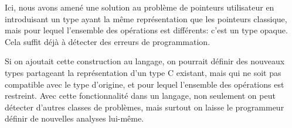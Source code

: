 Ici, nous avons amené une solution au problème de pointeurs utilisateur en
introduisant un type ayant la même représentation que les pointeurs classique,
mais pour lequel l'ensemble des opérations est différents: c'est un type
opaque. Cela suffit déjà à détecter des erreurs de programmation.

Si on ajoutait cette construction au langage, on pourrait définir des nouveaux
types partageant la représentation d'un type C existant, mais qui ne soit pas
compatible avec le type d'origine, et pour lequel l'ensemble des opérations est
restreint. Avec cette fonctionnalité dans un langage, non seulement on peut
détecter d'autres classes de problèmes, mais surtout on laisse le programmeur
définir de nouvelles analyses lui-même.

